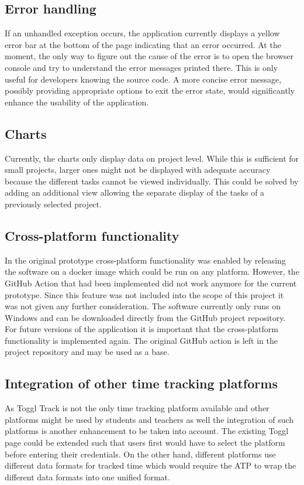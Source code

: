 \subsection{Error handling}
If an unhandled exception occurs, the application currently displays a yellow error bar at the bottom of the page indicating that an error occurred. At the moment, the only way to figure out the cause of the error is to open the browser console and try to understand the error messages printed there. This is only useful for developers knowing the source code. A more concise error message, possibly providing appropriate options to exit the error state, would significantly enhance the usability of the application.

\subsection{Charts}
Currently, the charts only display data on project level. While this is sufficient for small projects, larger ones might not be displayed with adequate accuracy because the different tasks cannot be viewed individually. This could be solved by adding an additional view allowing the separate display of the tasks of a previously selected project.

\subsection{Cross-platform functionality}
In the original prototype cross-platform functionality was enabled by releasing the software on a docker image which could be run on any platform. However, the GitHub Action that had been implemented did not work anymore for the current prototype. Since this feature was not included into the scope of this project it was not given any further consideration. The software currently only runs on Windows and can be downloaded directly from the GitHub project repository. For future versions of the application it is important that the cross-platform functionality is implemented again. The original GitHub action is left in the project repository and may be used as a base.

\subsection{Integration of other time tracking platforms}
As Toggl Track is not the only time tracking platform available and other platforms might be used by students and teachers as well the integration of such platforms is another enhancement to be taken into account. The existing Toggl page could be extended such that users first would have to select the platform before entering their credentials. On the other hand, different platforms use different data formats for tracked time which would require the ATP to wrap the different data formats into one unified format.

